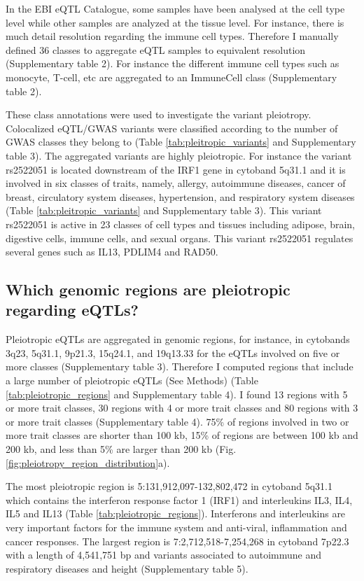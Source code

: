 In the EBI eQTL Catalogue, some samples have been analysed at the cell type level while other samples are analyzed at the tissue level.
%
For instance, there is much detail resolution regarding the immune cell types.
%
Therefore I manually defined 36 classes to aggregate eQTL samples to equivalent resolution (Supplementary table 2).
%
For instance the different immune cell types such as monocyte, T-cell, etc are aggregated to an ImmuneCell class (Supplementary table 2).

These class annotations were used to investigate the variant pleiotropy.
%
Colocalized eQTL/GWAS variants were classified according to the number of GWAS classes they belong to (Table \ref{tab:pleitropic_variants} and Supplementary table 3).
%
The aggregated variants are highly pleiotropic.
%
For instance the variant rs2522051 is located downstream of the IRF1 gene in cytoband 5q31.1 and it is involved in six classes of traits, namely,
allergy, autoimmune diseases, cancer of breast, circulatory system diseases, hypertension, and respiratory system diseases
(Table \ref{tab:pleitropic_variants} and Supplementary table 3).
%
This variant rs2522051 is active in 23 classes of cell types and tissues including adipose, brain, digestive cells, immune cells, and sexual organs.
%
This variant rs2522051 regulates several genes such as IL13, PDLIM4 and RAD50.

\subsection*{Which genomic regions are pleiotropic regarding eQTLs?}

Pleiotropic eQTLs are aggregated in genomic regions, for instance, in cytobands 3q23, 5q31.1, 9p21.3, 15q24.1, and 19q13.33 for the eQTLs involved on five or more classes (Supplementary table 3).
%
Therefore I computed regions that include a large number of pleiotropic eQTLs (See Methods) (Table \ref{tab:pleiotropic_regions} and Supplementary table 4).
%
I found 13 regions with 5 or more trait classes, 30 regions with 4 or more trait classes and 80 regions with 3 or more trait classes (Supplementary table 4).
%
75\% of regions involved in two or more trait classes are shorter than 100 kb, 15\% of regions are between 100 kb and 200 kb, and less than 5\% are larger than 200 kb (Fig. \ref{fig:pleiotropy_region_distribution}a).

The most pleiotropic region is 5:131,912,097-132,802,472 in cytoband 5q31.1 which contains the interferon response factor 1 (IRF1) and interleukins IL3, IL4, IL5 and IL13 (Table \ref{tab:pleiotropic_regions}).
%
Interferons and interleukins are very important factors for the immune system and anti-viral, inflammation and cancer responses.
%
The largest region is 7:2,712,518-7,254,268 in cytoband 7p22.3 with a length of 4,541,751 bp and variants associated to autoimmune and respiratory diseases and height (Supplementary table 5).

